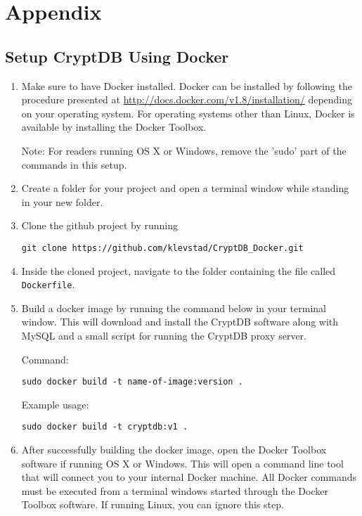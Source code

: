 \chapter{Appendix}
\label{chp:appendix}

\section{Setup CryptDB Using Docker}
\label{app:setup}

\begin{enumerate}
\item Make sure to have Docker installed. Docker can be installed by following the procedure presented at \url{http://docs.docker.com/v1.8/installation/} depending on your operating system. For operating systems other than Linux, Docker is available by installing the Docker Toolbox.

\noindent
Note: For readers running OS X or Windows, remove the 'sudo' part of the commands in this setup.

\item Create a folder for your project and open a terminal window while standing in your new folder.

\item Clone the github project by running

\verb!git clone https://github.com/klevstad/CryptDB_Docker.git!

\item Inside the cloned project, navigate to the folder containing the file called \verb!Dockerfile!.

\item Build a docker image by running the command below in your terminal window. This will download and install the CryptDB software along with MySQL and a small script for running the CryptDB proxy server.

Command:

\verb!sudo docker build -t name-of-image:version .!

Example usage:

\verb!sudo docker build -t cryptdb:v1 .!

\item After successfully building the docker image, open the Docker Toolbox software if running OS X or Windows. This will open a command line tool that will connect you to your internal Docker machine. All Docker commands must be executed from a terminal windows started through the Docker Toolbox software. If running Linux, you can ignore this step.


\end{enumerate}

